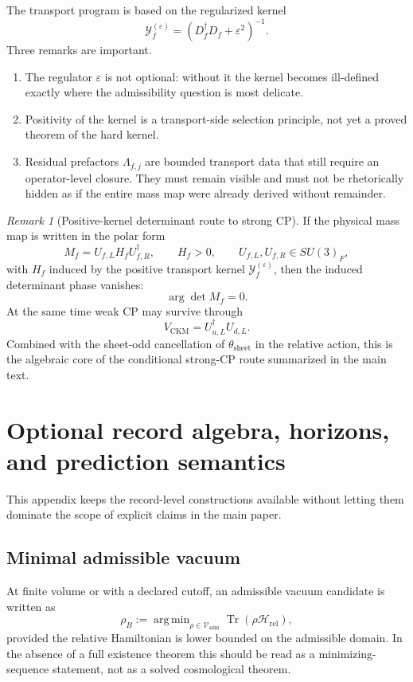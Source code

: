 \documentclass[11pt,a4paper]{article}
\theoremstyle{definition}
\theoremstyle{remark}
\newtheorem*{remark}{Remark}
\DeclareMathOperator{\tr}{Tr}
\DeclareMathOperator{\argmin}{arg\,min}
\newcommand{\Vadm}{\mathcal V_{\mathrm{adm}}}
\newcommand{\Hrel}{\mathcal H_{\mathrm{rel}}}
\begin{document}
The transport program is based on the regularized kernel
\[
\mathcal Y_f^{(\varepsilon)}=(D_f^\dagger D_f+\varepsilon^2)^{-1}.
\]
Three remarks are important.
\begin{enumerate}[leftmargin=1.5em, topsep=3pt, itemsep=3pt]
    \item The regulator $\varepsilon$ is not optional: without it the kernel becomes ill-defined exactly where the admissibility question is most delicate.
    \item Positivity of the kernel is a transport-side selection principle, not yet a proved theorem of the hard kernel.
    \item Residual prefactors $\Lambda_{f,j}$ are bounded transport data that still require an operator-level closure. They must remain visible and must not be rhetorically hidden as if the entire mass map were already derived without remainder.
\end{enumerate}

\begin{remark}[Positive-kernel determinant route to strong CP]
If the physical mass map is written in the polar form
\[
M_f=U_{f,L}H_fU_{f,R}^\dagger,
\qquad
H_f>0,
\qquad
U_{f,L},U_{f,R}\in SU(3)_F,
\]
with $H_f$ induced by the positive transport kernel $\mathcal Y_f^{(\varepsilon)}$, then the induced determinant phase vanishes:
\[
\arg\det M_f=0.
\]
At the same time weak CP may survive through
\[
V_{\mathrm{CKM}}=U_{u,L}^\dagger U_{d,L}.
\]
Combined with the sheet-odd cancellation of $\theta_{\mathrm{sheet}}$ in the relative action, this is the algebraic core of the conditional strong-CP route summarized in the main text.
\end{remark}

\section{Optional record algebra, horizons, and prediction semantics}
\label{app:record}

This appendix keeps the record-level constructions available without letting them dominate the scope of explicit claims in the main paper.

\subsection{Minimal admissible vacuum}

At finite volume or with a declared cutoff, an admissible vacuum candidate is written as
\[
\rho_B
:=
\argmin_{\rho\in\Vadm}\tr(\rho\Hrel),
\]
provided the relative Hamiltonian is lower bounded on the admissible domain. In the absence of a full existence theorem this should be read as a minimizing-sequence statement, not as a solved cosmological theorem.
\end{document}
